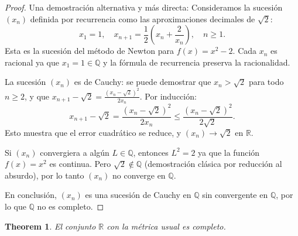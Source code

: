 \documentclass[11pt,a4paper]{article}
\theoremstyle{plain}
\newtheorem{theorem}{Theorem}[section]
\theoremstyle{definition}
\begin{document}
\begin{proof}
Una demostración alternativa y más directa: Consideramos la sucesión $(x_n)$ definida por recurrencia como las aproximaciones decimales de $\sqrt{2}$:
\[
x_1 = 1, \quad x_{n+1} = \frac{1}{2}\left(x_n + \frac{2}{x_n}\right), \quad n \geq 1.
\]
Esta es la sucesión del método de Newton para $f(x) = x^2 - 2$. Cada $x_n$ es racional ya que $x_1 = 1 \in \mathbb{Q}$ y la fórmula de recurrencia preserva la racionalidad.

La sucesión $(x_n)$ es de Cauchy: se puede demostrar que $x_n > \sqrt{2}$ para todo $n \geq 2$, y que $x_{n+1} - \sqrt{2} = \frac{(x_n - \sqrt{2})^2}{2x_n}$. Por inducción:
\[
x_{n+1} - \sqrt{2} = \frac{(x_n - \sqrt{2})^2}{2x_n} \leq \frac{(x_n - \sqrt{2})^2}{2\sqrt{2}}.
\]
Esto muestra que el error cuadrático se reduce, y $(x_n) \to \sqrt{2}$ en $\mathbb{R}$.

Si $(x_n)$ convergiera a algún $L \in \mathbb{Q}$, entonces $L^2 = 2$ ya que la función $f(x) = x^2$ es continua. Pero $\sqrt{2} \notin \mathbb{Q}$ (demostración clásica por reducción al absurdo), por lo tanto $(x_n)$ no converge en $\mathbb{Q}$.

En conclusión, $(x_n)$ es una sucesión de Cauchy en $\mathbb{Q}$ sin convergente en $\mathbb{Q}$, por lo que $\mathbb{Q}$ no es completo.
\end{proof}

\begin{theorem}\label{thm:r_completo}
El conjunto $\mathbb{R}$ con la métrica usual es completo.
\end{theorem}
\end{document}
